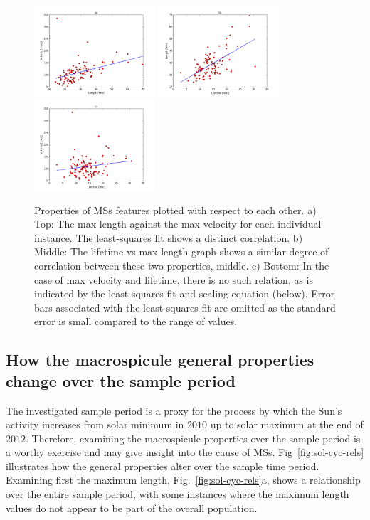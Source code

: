 \begin{figure}[h!]
	\centering
	\includegraphics[width=0.4\textwidth]{Chapter3/Figs/length_max_vs.pdf}
	\includegraphics[width=0.4\textwidth]{Chapter3/Figs/lifetime_vs_length.pdf}
	\includegraphics[width=0.4\textwidth]{Chapter3/Figs/velocity_vs_lt.pdf}
	\caption{\small Properties of MSs features plotted with respect to each other. a) Top: The max length against the max velocity for each individual instance. The least-squares fit shows a distinct correlation. b) Middle: The lifetime vs max length graph shows a similar degree of correlation between these two properties, middle. c) Bottom: In the case of max velocity and lifetime, there is no such relation, as is indicated by the least squares fit and scaling equation (below). Error bars associated with the least squares fit are omitted as the standard error is small compared to the range of values.}
	\label{fig:prop-rel}	
\end{figure}


\subsection{How the macrospicule general properties change over the sample period}
The investigated sample period is a proxy for the process by which the Sun's activity increases from solar minimum in $2010$ up to solar maximum at the end of $2012$. Therefore, examining the macrospicule properties over the sample period is a worthy exercise and may give insight into the cause of MSs. Fig~\ref{fig:sol-cyc-rels} illustrates how the general properties alter over the sample time period. Examining first the maximum length, Fig.~\ref{fig:sol-cyc-rels}a, shows a relationship over the entire sample period, with some instances where the maximum length values do not appear to be part of the overall population. 

